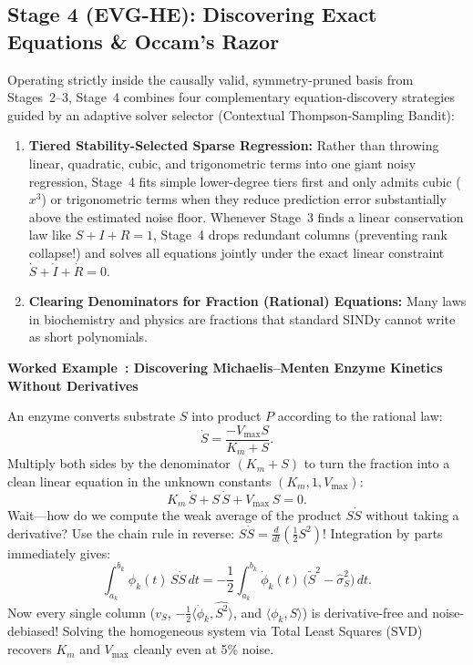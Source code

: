 \documentclass[11pt,a4paper]{article}
\newcounter{workedexcnt}
\newenvironment{workedexample}[1]{%
  \refstepcounter{workedexcnt}%
  \begin{lrbox}{\calloutbox}%
    \begin{minipage}{\dimexpr\textwidth-2\fboxsep-2\fboxrule\relax}
      \vspace{0.3em}
      \noindent\textbf{\color{black!85}Worked Example~\theworkedexcnt: #1}\par\smallskip
      \normalfont
}{%
      \vspace{0.3em}
    \end{minipage}%
  \end{lrbox}%
  \par\medskip\noindent
  \fcolorbox{gray!45}{gray!8}{\usebox{\calloutbox}}%
  \par\medskip
}
\begin{document}
\subsection{Stage 4 (EVG-HE): Discovering Exact Equations \& Occam's Razor}
Operating strictly inside the causally valid, symmetry-pruned basis from Stages~2--3, Stage~4 combines four complementary equation-discovery strategies guided by an adaptive solver selector (Contextual Thompson-Sampling Bandit):

\begin{enumerate}
  \item \textbf{Tiered Stability-Selected Sparse Regression:} Rather than throwing linear, quadratic, cubic, and trigonometric terms into one giant noisy regression, Stage~4 fits simple lower-degree tiers first and only admits cubic ($x^3$) or trigonometric terms when they reduce prediction error substantially above the estimated noise floor. Whenever Stage~3 finds a linear conservation law like $S + I + R = 1$, Stage~4 drops redundant columns (preventing rank collapse!) and solves all equations jointly under the exact linear constraint $\dot{S} + \dot{I} + \dot{R} = 0$.
  \item \textbf{Clearing Denominators for Fraction (Rational) Equations:} Many laws in biochemistry and physics are fractions that standard SINDy cannot write as short polynomials.
\end{enumerate}

\begin{workedexample}{Discovering Michaelis--Menten Enzyme Kinetics Without Derivatives}
An enzyme converts substrate $S$ into product $P$ according to the rational law:
\begin{equation}
  \dot{S} = \frac{-V_{\max} S}{K_m + S}.
\end{equation}
Multiply both sides by the denominator $(K_m + S)$ to turn the fraction into a clean linear equation in the unknown constants $(K_m, 1, V_{\max})$:
\begin{equation}
  K_m\,\dot{S} + S\,\dot{S} + V_{\max}\,S = 0.
\end{equation}
Wait—how do we compute the weak average of the product $S\dot{S}$ without taking a derivative? Use the chain rule in reverse: $S\dot{S} = \frac{d}{dt}\!\left(\frac{1}{2}S^2\right)$! Integration by parts immediately gives:
\begin{equation}
  \int_{a_k}^{b_k} \phi_k(t)\,S\dot{S}\,dt
  = -\frac{1}{2}\int_{a_k}^{b_k} \dot{\phi}_k(t)\,\big(\tilde{S}^2 - \hat{\sigma}_S^2\big)\,dt.
\end{equation}
Now every single column ($v_S$, $-\frac{1}{2}\langle\dot{\phi}_k, \widehat{S^2}\rangle$, and $\langle\phi_k, S\rangle$) is derivative-free and noise-debiased! Solving the homogeneous system via Total Least Squares (SVD) recovers $K_m$ and $V_{\max}$ cleanly even at 5\% noise.
\end{workedexample}
\end{document}
